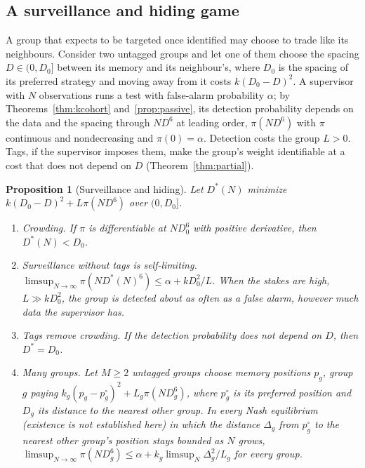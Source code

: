 \documentclass[12pt]{article}
\newtheorem{proposition}[theorem]{Proposition}
\theoremstyle{definition}
\theoremstyle{remark}
\begin{document}
\subsection{A surveillance and hiding game}

A group that expects to be targeted once identified may choose to trade like its neighbours. Consider two untagged groups and let one of them choose the spacing $D\in(0,D_0]$ between its memory and its neighbour's, where $D_0$ is the spacing of its preferred strategy and moving away from it costs $k(D_0-D)^2$. A supervisor with $N$ observations runs a test with false-alarm probability $\alpha$; by Theorems~\ref{thm:kcohort} and~\ref{prop:passive}, its detection probability depends on the data and the spacing through $ND^6$ at leading order, $\pi(ND^6)$ with $\pi$ continuous and nondecreasing and $\pi(0)=\alpha$. Detection costs the group $L>0$. Tags, if the supervisor imposes them, make the group's weight identifiable at a cost that does not depend on $D$ (Theorem~\ref{thm:partial}).

\begin{proposition}[Surveillance and hiding]\label{prop:hidegame}
Let $D^*(N)$ minimize $k(D_0-D)^2+L\pi(ND^6)$ over $(0,D_0]$.
\begin{enumerate}[label=(\roman*),itemsep=1pt]
\item \emph{Crowding.} If $\pi$ is differentiable at $ND_0^6$ with positive derivative, then $D^*(N)<D_0$.
\item \emph{Surveillance without tags is self-limiting.} $\limsup_{N\to\infty}\pi(ND^*(N)^6)\le\alpha+kD_0^2/L$. When the stakes are high, $L\gg kD_0^2$, the group is detected about as often as a false alarm, however much data the supervisor has.
\item \emph{Tags remove crowding.} If the detection probability does not depend on $D$, then $D^*=D_0$.
\item \emph{Many groups.} Let $M\ge2$ untagged groups choose memory positions $p_g$, group $g$ paying $k_g(p_g-p^\circ_g)^2+L_g\pi(ND_g^6)$, where $p^\circ_g$ is its preferred position and $D_g$ its distance to the nearest other group. In every Nash equilibrium (existence is not established here) in which the distance $\Delta_g$ from $p^\circ_g$ to the nearest other group's position stays bounded as $N$ grows, $\limsup_{N\to\infty}\pi(ND_g^6)\le\alpha+k_g\limsup_N\Delta_g^2/L_g$ for every group.
\end{enumerate}
\end{proposition}
\end{document}
